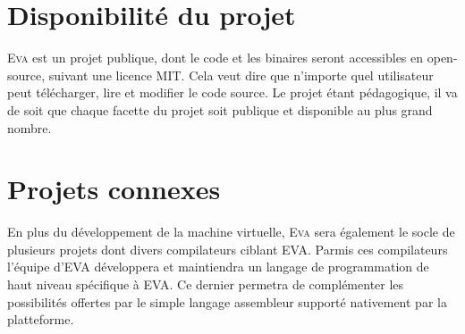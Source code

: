 \documentclass[11pt,twoside,french]{article}
\newcommand{\noun}[1]{\textsc{#1}}
\begin{document}
\section{Disponibilité du projet}

\noun{Eva} est un projet publique, dont le code et les binaires seront
accessibles en open-source, suivant une licence MIT. Cela veut dire
que n'importe quel utilisateur peut télécharger, lire et modifier
le code source. Le projet étant pédagogique, il va de soit que chaque
facette du projet soit publique et disponible au plus grand nombre.

\section{Projets connexes}

En plus du développement de la machine virtuelle, \noun{Eva} sera
également le socle de plusieurs projets dont divers compilateurs ciblant
EVA. Parmis ces compilateurs l'équipe d'EVA développera et maintiendra
un langage de programmation de haut niveau spécifique à EVA. Ce dernier
permetra de complémenter les possibilités offertes par le simple langage
assembleur supporté nativement par la platteforme.
\end{document}
